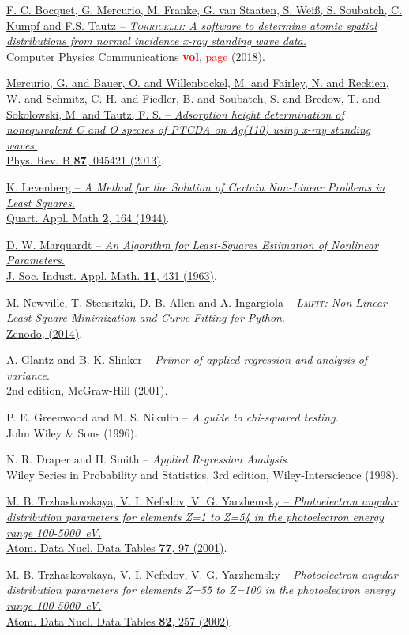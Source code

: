 \documentclass[oldfontcommands,openany,oneside]{memoir}
\newcommand{\myref}[7]{\href{http://dx.doi.org/#7}{#1 -- \emph{#2.}\\ #3 \textbf{#4}, #5 (#6)}.}
\newcommand{\red}[1]{\textcolor{red}{#1}}
\begin{document}
\begin{thebibliography}{99} %
 \myref{F. C. Bocquet, G. Mercurio, M. Franke, G. van Staaten, S. Wei{\ss}, S. Soubatch, C. Kumpf and F.S. Tautz}{\textsc{Torricelli}: A software to determine atomic spatial distributions from normal incidence x-ray standing wave data}{Computer Physics Communications}{\red{vol}}{\red{page}}{2018}{}

 \myref{Mercurio, G. and Bauer, O. and Willenbockel, M. and Fairley, N. and Reckien, W. and Schmitz, C. H. and Fiedler, B. and Soubatch, S. and Bredow, T. and Sokolowski, M. and Tautz, F. S.} {Adsorption height determination of nonequivalent C and O species of PTCDA on Ag(110) using x-ray standing waves}{Phys. Rev. B}{87}{045421}{2013}{10.1103/PhysRevB.87.045421}

 \myref{K. Levenberg}{A Method for the Solution of Certain Non-Linear Problems in Least Squares}{Quart. Appl. Math}{2}{164}{1944}{10.1090/qam/10666}

 \myref{D. W. Marquardt}{An Algorithm for Least-Squares Estimation of Nonlinear Parameters}{J. Soc. Indust. Appl. Math.}{11}{431}{1963}{10.1137/0111030}

 \href{http://dx.doi.org/10.5281/zenodo.11813}{M. Newville, T. Stensitzki, D. B. Allen and A. Ingargiola -- \emph{\textsc{Lmfit}: Non-Linear Least-Square Minimization and Curve-Fitting for Python}.\\ Zenodo, (2014)}.

 A. Glantz and B. K. Slinker -- \emph{Primer of applied regression and analysis of variance}.\\ 2nd edition, McGraw-Hill (2001).

   P. E. Greenwood and M. S. Nikulin -- \emph{A guide to chi-squared testing}.\\ John Wiley \& Sons (1996).
  
 N. R. Draper and H. Smith -- \emph{Applied Regression Analysis}.\\ Wiley Series in Probability and Statistics, 3rd edition, Wiley-Interscience (1998).


 \myref{M. B. Trzhaskovskaya, V. I. Nefedov, V. G. Yarzhemsky}{Photoelectron angular distribution parameters for elements Z=1 to Z=54 in the photoelectron energy range 100-5000~eV}{Atom. Data Nucl. Data Tables}{77}{97}{2001}{10.1006/adnd.2000.0849}

 \myref{M. B. Trzhaskovskaya, V. I. Nefedov, V. G. Yarzhemsky}{Photoelectron angular distribution parameters for elements Z=55 to Z=100 in the photoelectron energy range 100-5000~eV}{Atom. Data Nucl. Data Tables}{82}{257}{2002}{10.1006/adnd.2002.0886}
\end{thebibliography}
\end{document}
